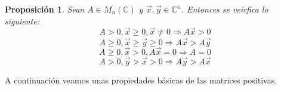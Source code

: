 \documentclass[size=a4, parskip=half, titlepage=false, toc=flat, toc=bib, 12pt]{scrartcl}
\theoremstyle{theorem-style}
\newtheorem{nprop}{Proposición}[section]
\theoremstyle{definition-style}
\theoremstyle{remark-style}
\theoremstyle{example-style}
\theoremstyle{definition-style}
\theoremstyle{remark-style}
\begin{document}
\begin{nprop}
Sean $A \in M_n(\mathbb{C})$ y $\vec{x},\vec{y} \in \mathbb{C}^n$. Entonces se veirfica lo siguiente:
\begin{equation}\label{eq1} A > 0, \vec{x} \geq 0, \vec{x} \neq 0 \Rightarrow A \vec{x} > 0 \end{equation}
\begin{equation} A \geq 0, \vec{x} \geq \vec{y} \geq 0 \Rightarrow A \vec{x} > A\vec{y} \end{equation}
\begin{equation} A \geq 0, \vec{x} > 0, A \vec{x} = 0 \Rightarrow A = 0 \end{equation}
\begin{equation} \label{eq4} A > 0, \vec{y} > \vec{x} > 0 \Rightarrow A\vec{y} > A\vec{x} \end{equation}
\end{nprop}

A continuación veamos unas propiedades básicas de las matrices positivas.
\end{document}
